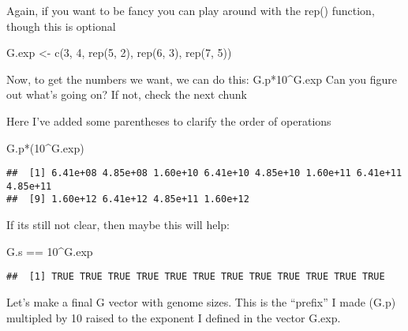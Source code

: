 \documentclass[
]{book}
\newenvironment{Shaded}{\begin{snugshade}}{\end{snugshade}}
\newcommand{\DecValTok}[1]{\textcolor[rgb]{0.00,0.00,0.81}{#1}}
\newcommand{\FunctionTok}[1]{\textcolor[rgb]{0.00,0.00,0.00}{#1}}
\newcommand{\NormalTok}[1]{#1}
\newcommand{\OtherTok}[1]{\textcolor[rgb]{0.56,0.35,0.01}{#1}}
\newcommand{\SpecialCharTok}[1]{\textcolor[rgb]{0.00,0.00,0.00}{#1}}
\begin{document}
Again, if you want to be fancy you can play around with the rep() function, though this is optional

\begin{Shaded}
\begin{Highlighting}[]
\NormalTok{G.exp }\OtherTok{\textless{}{-}} \FunctionTok{c}\NormalTok{(}\DecValTok{3}\NormalTok{, }\DecValTok{4}\NormalTok{,    }
         \FunctionTok{rep}\NormalTok{(}\DecValTok{5}\NormalTok{, }\DecValTok{2}\NormalTok{),}
         \FunctionTok{rep}\NormalTok{(}\DecValTok{6}\NormalTok{, }\DecValTok{3}\NormalTok{),}
         \FunctionTok{rep}\NormalTok{(}\DecValTok{7}\NormalTok{, }\DecValTok{5}\NormalTok{))}
\end{Highlighting}
\end{Shaded}

Now, to get the numbers we want, we can do this: G.p*10\^{}G.exp
Can you figure out what's going on? If not, check the next chunk

Here I've added some parentheses to clarify the order of operations

\begin{Shaded}
\begin{Highlighting}[]
\NormalTok{ G.p}\SpecialCharTok{*}\NormalTok{(}\DecValTok{10}\SpecialCharTok{\^{}}\NormalTok{G.exp)}
\end{Highlighting}
\end{Shaded}

\begin{verbatim}
##  [1] 6.41e+08 4.85e+08 1.60e+10 6.41e+10 4.85e+10 1.60e+11 6.41e+11 4.85e+11
##  [9] 1.60e+12 6.41e+12 4.85e+11 1.60e+12
\end{verbatim}

If its still not clear, then maybe this will help:

\begin{Shaded}
\begin{Highlighting}[]
\NormalTok{G.s }\SpecialCharTok{==} \DecValTok{10}\SpecialCharTok{\^{}}\NormalTok{G.exp}
\end{Highlighting}
\end{Shaded}

\begin{verbatim}
##  [1] TRUE TRUE TRUE TRUE TRUE TRUE TRUE TRUE TRUE TRUE TRUE TRUE
\end{verbatim}

Let's make a final G vector with genome sizes. This is the ``prefix'' I made (G.p) multipled by 10 raised to the exponent I defined in the vector G.exp.
\end{document}
